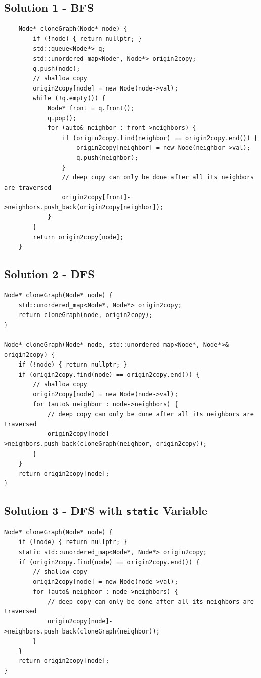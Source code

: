 \subsection*{Solution 1 - BFS}
\begin{lstlisting}
	Node* cloneGraph(Node* node) {
		if (!node) { return nullptr; }
		std::queue<Node*> q;
		std::unordered_map<Node*, Node*> origin2copy;
		q.push(node);
		// shallow copy
		origin2copy[node] = new Node(node->val);
		while (!q.empty()) {
			Node* front = q.front();
			q.pop();
			for (auto& neighbor : front->neighbors) {
				if (origin2copy.find(neighbor) == origin2copy.end()) {
					origin2copy[neighbor] = new Node(neighbor->val);
					q.push(neighbor);
				}
				// deep copy can only be done after all its neighbors are traversed
				origin2copy[front]->neighbors.push_back(origin2copy[neighbor]);
			}
		}
		return origin2copy[node];
	}
\end{lstlisting}

\subsection*{Solution 2 - DFS}
\begin{lstlisting}
Node* cloneGraph(Node* node) {
	std::unordered_map<Node*, Node*> origin2copy;
	return cloneGraph(node, origin2copy);
}

Node* cloneGraph(Node* node, std::unordered_map<Node*, Node*>& origin2copy) {
	if (!node) { return nullptr; }
	if (origin2copy.find(node) == origin2copy.end()) {
		// shallow copy
		origin2copy[node] = new Node(node->val);
		for (auto& neighbor : node->neighbors) {
			// deep copy can only be done after all its neighbors are traversed
			origin2copy[node]->neighbors.push_back(cloneGraph(neighbor, origin2copy));
		}
	}
	return origin2copy[node];
}
\end{lstlisting}

\subsection*{Solution 3 - DFS with {\colorbox{CodeBackground}{\lstinline|static|}} Variable}
\begin{lstlisting}
Node* cloneGraph(Node* node) {
	if (!node) { return nullptr; }
	static std::unordered_map<Node*, Node*> origin2copy;
	if (origin2copy.find(node) == origin2copy.end()) {
		// shallow copy
		origin2copy[node] = new Node(node->val);
		for (auto& neighbor : node->neighbors) {
			// deep copy can only be done after all its neighbors are traversed
			origin2copy[node]->neighbors.push_back(cloneGraph(neighbor));
		}
	}
	return origin2copy[node];
}
\end{lstlisting}

